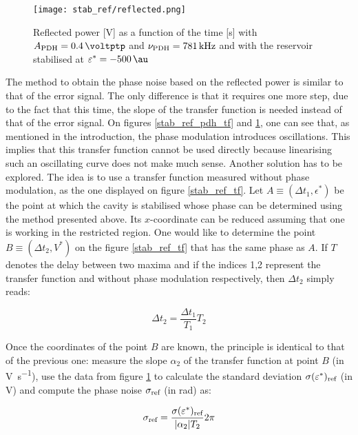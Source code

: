 \begin{figure}
	\centering
	\texttt{[image: stab\_ref/reflected.png]}
	\caption{Reflected power [\si{\volt}] as a function of the time [\si{\second}] with $\tind{A}{PDH} = \SI{0.4}{\voltptp}$ and $\nu_{\text{PDH}} = \SI{781}{\kilo\hertz}$ and with the reservoir stabilised at $\epsilon^* = \SI{-500}{\au}$}
	\label{stab_ref_reflected}
\end{figure}

The method to obtain the phase noise based on the reflected power is similar to that of the \pdh error signal. The only difference is that it requires one more step, due to the fact that this time, the slope of the transfer function is needed instead of that of the error signal. On figures \ref{stab_ref_pdh_tf} and \ref{stab_ref_reflected}, one can see that, as mentioned in the introduction, the \pdh phase modulation introduces oscillations. This implies that this transfer function cannot be used directly because linearising such an oscillating curve does not make much sense. Another solution has to be explored. The idea is to use a transfer function measured without \pdh phase modulation, as the one displayed on figure \ref{stab_ref_tf}. Let $A\equiv(\Delta t_1, \epsilon^*)$ be the point at which the cavity is stabilised whose phase can be determined using the method presented above. Its $x$-coordinate can be reduced assuming that one is working in the restricted region. One would like to determine the point $B\equiv(\Delta t_2, V^*)$ on the figure \ref{stab_ref_tf} that has the same phase as $A$. If $T$ denotes the delay between two maxima and if the indices 1,2 represent the transfer function and without phase modulation respectively, then $\Delta t_2$ simply reads:

\begin{equation}
	\Delta t_2 = \frac{\Delta t_1}{T_1} T_2
\end{equation}

Once the coordinates of the point $B$ are known, the principle is identical to that of the previous one: measure the slope $\alpha_2$ of the transfer function at point $B$ (in \si{\volt\per\second}), use the data from figure \ref{stab_ref_reflected} to calculate the standard deviation $\sigma(\varepsilon^*)_{\text{ref}}$ (in \si{\volt}) and compute the phase noise $\sigma_{\text{ref}}$ (in \si{\radian}) as:

\begin{equation}
	\sigma_{\text{ref}} = \frac{\sigma(\varepsilon^*)_{\text{ref}}}{|\alpha_2| T_2}2\pi
\end{equation}

